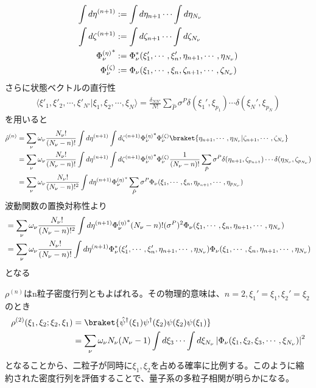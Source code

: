 \documentclass[dvipdfmx, 11pt, a4paper]{jsarticle}
\numberwithin{equation}{section}
\theoremstyle{definition}
\begin{document}
\begin{derivationBox}
\begin{align}
            \int d\eta^{(n+1)} &:= \int d\eta_{n+1} \cdots \int d\eta_{N_\nu} \notag \\
            \int d\zeta^{(n+1)} &:= \int d\zeta_{n+1} \cdots \int d\zeta_{N_\nu} \notag \\
            {\Phi_\nu^{(\eta)}}^* &:= \Phi_\nu^* (\xi_1',\cdots,\xi_n',\eta_{n+1},\cdots,\eta_{N_\nu})\notag \\
            {\Phi_\nu^{(\zeta)}} &:= \Phi_\nu (\xi_1,\cdots,\xi_n,\zeta_{n+1},\cdots,\zeta_{N_\nu})
        \end{align}
        さらに状態ベクトルの直行性
        \begin{align}
            \langle \xi'_1,\xi'_2,\cdots,\xi'_{N'}|\xi_1,\xi_2,\cdots,\xi_N \rangle = \frac{\delta_{NN'}}{N!} \sum_{\hat{P}} \sigma^P \delta (\xi_1',\xi_{p_1})\cdots \delta(\xi_N',\xi_{p_N}) 
        \end{align}
        を用いると
        \begin{align}
            \hat{\rho}^{(n)} &= \sum_\nu \omega_\nu \frac{N_\nu !}{(N_\nu - n)!} \int d\eta^{(n+1)}\int d\zeta^{(n+1)}  {\Phi_\nu^{(\eta)}}^* {\Phi_\nu^{(\zeta)}} \braket{\eta_{n+1},\cdots,\eta_{N_\nu}|\zeta_{n+1},\cdots,\zeta_{N_\nu}} \notag \\
            &= \sum_\nu \omega_\nu \frac{N_\nu !}{(N_\nu - n)!} \int d\eta^{(n+1)}\int d\zeta^{(n+1)}  {\Phi_\nu^{(\eta)}}^* {\Phi_\nu^{(\zeta)}} \frac{1}{(N_\nu-n)!} \sum_{\hat{P}} \sigma^P \delta(\eta_{n+1},\zeta_{p_{n+1}})\cdots\delta(\eta_{N_\nu},\zeta_{p_{N_\nu}}) \notag \\
            &= \sum_\nu \omega_\nu \frac{N_\nu !}{(N_\nu - n)!^2} \int d\eta^{(n+1)} {\Phi_\nu^{(\eta)}}^* \sum_{\hat{P}} \sigma^P \Phi_\nu(\xi_1, \cdots,\xi_n,\eta_{p_{n+1}},\cdots,\eta_{p_{N_\nu}}) 
        \end{align}
        波動関数の置換対称性より
        \begin{align}
            &= \sum_\nu \omega_\nu \frac{N_\nu !}{(N_\nu - n)!^2} \int d\eta^{(n+1)} {\Phi_\nu^{(\eta)}}^* (N_\nu - n)! (\sigma^P)^2 \Phi_\nu(\xi_1, \cdots,\xi_n,\eta_{{n+1}},\cdots,\eta_{{N_\nu}}) \notag \\
            &= \sum_\nu \omega_\nu \frac{N_\nu !}{(N_\nu - n)!} \int d\eta^{(n+1)} \Phi_\nu^*(\xi_1', \cdots,\xi_n',\eta_{{n+1}},\cdots,\eta_{{N_\nu}})  \Phi_\nu(\xi_1, \cdots,\xi_n,\eta_{{n+1}},\cdots,\eta_{{N_\nu}})
        \end{align}
        となる
    \end{derivationBox}
    $\rho^{(n)}$はn粒子密度行列ともよばれる。その物理的意味は、$n=2,\xi_1' = \xi_1,\xi_2' = \xi_2$のとき
    \begin{align}
        \rho^{(2)}(\xi_1,\xi_2;\xi_2,\xi_1) &= \braket{\hat{\psi}^\dagger(\xi_1)\psi^\dagger(\xi_2)\psi(\xi_2)\psi(\xi_1) }\notag \\
        &= \sum_\nu \omega_\nu N_\nu (N_\nu - 1) \int d\xi_3 \cdots \int d\xi_{N_\nu} \left| \Phi_\nu(\xi_1,\xi_2,\xi_3,\cdots,\xi_{N_\nu}) \right|^2
    \end{align}
    となることから、二粒子が同時に$\xi_1,\xi_2$を占める確率に比例する。このように縮約された密度行列を評価することで、量子系の多粒子相関が明らかになる。
\newpage
\end{document}
